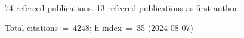74 refereed publications. 13 refeered publications as first author.

Total citations~=~4248; h-index~=~35 (2024-08-07)